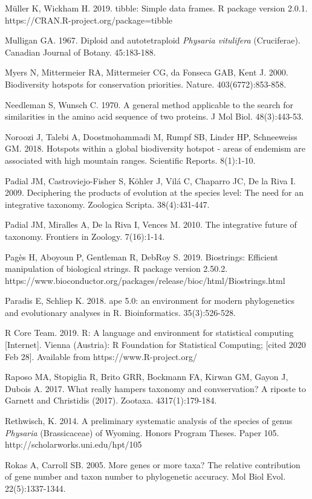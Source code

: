 Müller K, Wickham H. 2019. tibble: Simple data frames. R package version 2.0.1. https://CRAN.R-project.org/package=tibble

Mulligan GA. 1967. Diploid and autotetraploid \textit{Physaria vitulifera} (Cruciferae). Canadian Journal of Botany. 45:183-188.

Myers N, Mittermeier RA, Mittermeier CG, da Fonseca GAB, Kent J. 2000. Biodiversity hotspots for conservation priorities. Nature. 403(6772):853-858.

Needleman S, Wunsch C. 1970. A general method applicable to the search for similarities in the amino acid sequence of two proteins. J Mol Biol. 48(3):443-53.

Noroozi J, Talebi A, Doostmohammadi M, Rumpf SB, Linder HP, Schneeweiss GM. 2018. Hotspots within a global biodiversity hotspot - areas of endemism are associated with high mountain ranges. Scientific Reports. 8(1):1-10.

Padial JM, Castroviejo-Fisher S, Köhler J, Vilá C, Chaparro JC, De la Riva I. 2009. Deciphering the products of evolution at the species level: The need for an integrative taxonomy. Zoologica Scripta. 38(4):431-447.

Padial JM, Miralles A, De la Riva I, Vences M. 2010. The integrative future of taxonomy. Frontiers in Zoology. 7(16):1-14.

Pagès H, Aboyoun P, Gentleman R, DebRoy S. 2019. Biostrings: Efficient manipulation of biological strings. R package version 2.50.2. https://www.bioconductor.org/packages/release/bioc/html/Biostrings.html

Paradis E, Schliep K. 2018. ape 5.0: an environment for modern phylogenetics
and evolutionary analyses in R. Bioinformatics. 35(3):526-528.

R Core Team. 2019. R: A language and environment for statistical computing [Internet]. Vienna (Austria): R Foundation for Statistical Computing; [cited 2020 Feb 28]. Available from https://www.R-project.org/

Raposo MA, Stopiglia R, Brito GRR, Bockmann FA, Kirwan GM, Gayon J, Dubois A. 2017. What really hampers taxonomy and convservation? A riposte to Garnett and Christidis (2017). Zootaxa. 4317(1):179-184.

Rethwisch, K. 2014. A preliminary systematic analysis of the species of genus \textit{Physaria} (Brassicaceae) of Wyoming. Honors Program Theses. Paper 105.
http://scholarworks.uni.edu/hpt/105

Rokas A, Carroll SB. 2005. More genes or more taxa? The relative contribution of gene number and taxon number to phylogenetic accuracy. Mol Biol Evol. 22(5):1337-1344.


